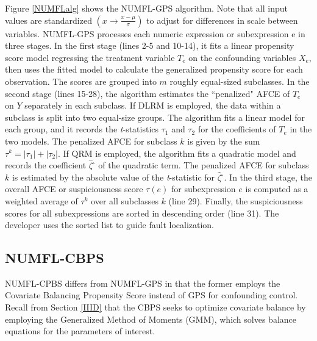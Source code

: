 \documentclass[times]{stvrauth}
\begin{document}
Figure \ref{NUMFLalg} shows the NUMFL-GPS algorithm.  Note that all input values are standardized $(x \to \frac{{x - \mu }}{\sigma })$ to adjust for differences in scale between variables.  NUMFL-GPS processes each numeric expression or subexpression e in three stages.  In the first stage (lines 2-5 and 10-14), it fits a linear propensity score model regressing the treatment variable $T_e$ on the confounding variables $X_e$, then uses the fitted model to calculate the generalized propensity score for each observation.  The scores are grouped into $m$ roughly equal-sized subclasses.  In the second stage (lines 15-28), the algorithm estimates the ``penalized" AFCE of $T_e$ on $Y$ separately in each subclass.  If DLRM is employed, the data within a subclass is split into two equal-size groups.  The algorithm fits a linear model for each group, and it records the {\it t}-statistics ${\tau _1}$ and ${\tau _2}$ for the coefficients of $T_e$ in the two models.  The penalized AFCE for subclass $k$ is given by the sum ${\tau ^k} = |{\tau _1}| + \left| {{\tau _2}} \right|$.  If QRM is employed, the algorithm fits a quadratic model and records the coefficient ${\hat \zeta }$ ̂ of the quadratic term.  The penalized AFCE for subclass $k$ is estimated by the absolute value of the {\it t}-statistic for ${\hat \zeta }$ ̂.  In the third stage, the overall AFCE or suspiciousness score $\tau(e)$ for subexpression $e$ is computed as a weighted average of $\tau^k$ over all subclasses $k$ (line 29).  Finally, the suspiciousness scores for all subexpressions are sorted in descending order (line 31).  The developer uses the sorted list to guide fault localization.

\subsection{NUMFL-CBPS}\label{IVB}
NUMFL-CPBS differs from NUMFL-GPS in that the former employs the Covariate Balancing Propensity Score instead of GPS for confounding control.   Recall from Section \ref{IIID} that the CBPS seeks to optimize covariate balance by employing the Generalized Method of Moments (GMM), which solves balance equations for the parameters of interest.
\end{document}
